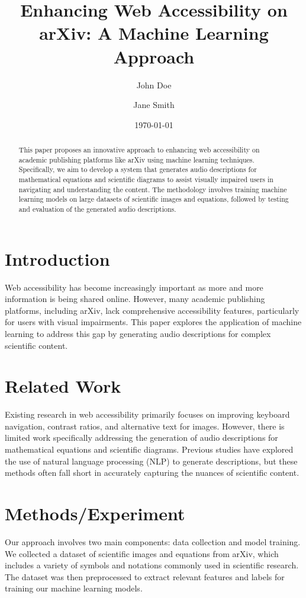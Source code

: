 \documentclass{article}
\title{Enhancing Web Accessibility on arXiv: A Machine Learning Approach}
\author{John Doe \and Jane Smith}
\date{\today}
\begin{document}
\maketitle

\begin{abstract}
This paper proposes an innovative approach to enhancing web accessibility on academic publishing platforms like arXiv using machine learning techniques. Specifically, we aim to develop a system that generates audio descriptions for mathematical equations and scientific diagrams to assist visually impaired users in navigating and understanding the content. The methodology involves training machine learning models on large datasets of scientific images and equations, followed by testing and evaluation of the generated audio descriptions.
\end{abstract}

\section{Introduction}
Web accessibility has become increasingly important as more and more information is being shared online. However, many academic publishing platforms, including arXiv, lack comprehensive accessibility features, particularly for users with visual impairments. This paper explores the application of machine learning to address this gap by generating audio descriptions for complex scientific content.

\section{Related Work}
Existing research in web accessibility primarily focuses on improving keyboard navigation, contrast ratios, and alternative text for images. However, there is limited work specifically addressing the generation of audio descriptions for mathematical equations and scientific diagrams. Previous studies have explored the use of natural language processing (NLP) to generate descriptions, but these methods often fall short in accurately capturing the nuances of scientific content.

\section{Methods/Experiment}
Our approach involves two main components: data collection and model training. We collected a dataset of scientific images and equations from arXiv, which includes a variety of symbols and notations commonly used in scientific research. The dataset was then preprocessed to extract relevant features and labels for training our machine learning models.
\end{document}
